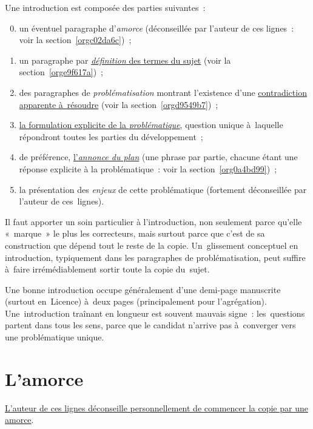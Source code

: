 \documentclass[a4paper,12pt]{report}
\begin{document}
Une introduction est composée des parties suivantes :

\begin{enumerate}
\setcounter{enumi}{-1}
\item un éventuel paragraphe d'\emph{amorce} (déconseillée par l'auteur de
ces lignes : voir la section \ref{orgc02da6c}) ;

\item un paragraphe par \uline{\emph{définition} des termes du sujet} (voir la
section \ref{orge9f617a}) ;

\item des paragraphes de \emph{problématisation} montrant l'existence d'une
\uline{contradiction apparente à résoudre} (voir la
section \ref{orgd9549b7}) ;

\item \uline{la formulation explicite de la \emph{problématique}}, question unique
à laquelle répondront toutes les parties du développement ;

\item de préférence, \uline{l'\emph{annonce du plan}} (une phrase par partie, chacune
étant une réponse explicite à la problématique : voir la
section \ref{org0a4bd99}) ;

\setcounter{enumi}{-1}
\item la présentation des \emph{enjeux} de cette problématique (fortement
déconseillée par l'auteur de ces lignes).
\end{enumerate}

Il faut apporter un soin particulier à l'introduction, non seulement
parce qu'elle « marque » le plus les correcteurs, mais surtout parce que
c'est de sa construction que dépend tout le reste de la copie.
Un glissement conceptuel en introduction, typiquement dans les
paragraphes de problématisation, peut suffire à faire irrémédiablement
sortir toute la copie du sujet.

Une bonne introduction occupe généralement d'une demi-page manuscrite
(surtout en Licence) à deux pages (principalement pour l'agrégation).
Une introduction traînant en longueur est souvent mauvais signe :
les questions partent dans tous les sens, parce que le candidat n'arrive
pas à converger vers une problématique unique.

\section{L'amorce}
\label{sec:orgc16d769}
\label{orgc02da6c}

\uline{L'auteur de ces lignes déconseille personnellement de commencer la
copie par une amorce}. 
\end{document}
